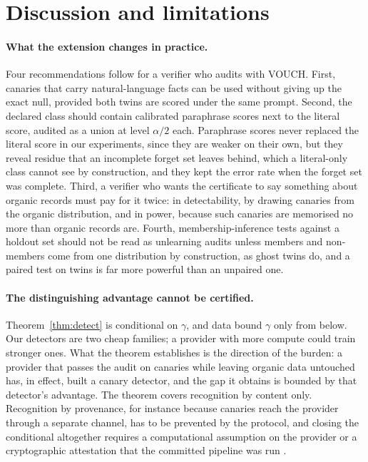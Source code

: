 \section{Discussion and limitations}\label{sec:discussion}

\paragraph{What the extension changes in practice.} Four recommendations follow for a
verifier who audits with VOUCH. First, canaries that carry natural-language facts can be
used without giving up the exact null, provided both twins are scored under the same
prompt. Second, the declared class should contain calibrated paraphrase scores next to the
literal score, audited as a union at level $\alpha/2$ each. Paraphrase scores never
replaced the literal score in our experiments, since they are weaker on their own, but
they reveal residue that an incomplete forget set leaves behind, which a literal-only class
cannot see by construction, and they kept the error rate when the forget set was
complete. Third, a verifier who wants the certificate to
say something about organic records must pay for it twice: in detectability, by drawing
canaries from the organic distribution, and in power, because such canaries are memorised
no more than organic records are. Fourth, membership-inference tests against a holdout
set should not be read as unlearning audits unless members and non-members come from one
distribution by construction, as ghost twins do, and a paired test on twins is far more
powerful than an unpaired one.

\paragraph{The distinguishing advantage cannot be certified.} Theorem~\ref{thm:detect} is
conditional on $\gamma$, and data bound $\gamma$ only from below. Our detectors are two
cheap families; a provider with more compute could train stronger ones. What the theorem
establishes is the direction of the burden: a provider that passes the audit on canaries
while leaving organic data untouched has, in effect, built a canary detector, and the gap
it obtains is bounded by that detector's advantage. The theorem covers recognition by
content only. Recognition by provenance, for instance because canaries reach the provider
through a separate channel, has to be prevented by the protocol, and closing the
conditional altogether requires a computational assumption on the provider or a
cryptographic attestation that the committed pipeline was run
\citep{eisenhofer2025verifiable}.

